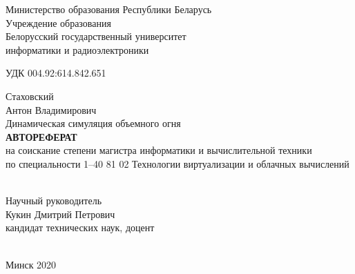 \begin{titlepage}
    \begin{center}
        Министерство образования Республики Беларусь \\
        Учреждение образования \\
        Белорусский государственный университет \\
        информатики и радиоэлектроники \\[4em]
    \end{center}

    \begin{raggedright}
        \begin{minipage}{8cm}
            УДК 004.92:614.842.651 \\[1em]
        \end{minipage}
    \end{raggedright}

    \begin{center}
        Стаховский \\
        Антон Владимирович \\[6em]

        Динамическая симуляция объемного огня \\[3em]

        \MakeUppercase{\textbf{Автореферат}} \\
        на соискание степени магистра информатики и вычислительной техники \\
        по специальности 1--40 81 02 Технологии виртуализации и облачных вычислений \\ [4em]
    \end{center}

    \hfill
    \begin{raggedleft}
        \begin{minipage}{8cm}
            \hrulefill{} \\[1em]
            Научный руководитель \\[1em]
            Кукин Дмитрий Петрович \\[1em]
            кандидат технических наук, доцент \\[1em]
            \null\hrulefill{} \\[1em]
        \end{minipage}
    \end{raggedleft}

    \vfill
    \begin{center}
        Минск 2020
    \end{center}
\end{titlepage}
